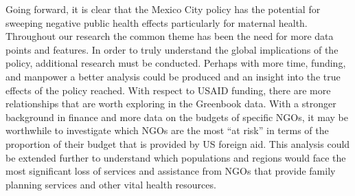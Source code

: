 \documentclass[11pt,]{article}
\begin{document}
Going forward, it is clear that the Mexico City policy has the potential
for sweeping negative public health effects particularly for maternal
health. Throughout our research the common theme has been the need for
more data points and features. In order to truly understand the global
implications of the policy, additional research must be conducted.
Perhaps with more time, funding, and manpower a better analysis could be
produced and an insight into the true effects of the policy reached.
With respect to USAID funding, there are more relationships that are
worth exploring in the Greenbook data. With a stronger background in
finance and more data on the budgets of specific NGOs, it may be
worthwhile to investigate which NGOs are the most ``at risk'' in terms
of the proportion of their budget that is provided by US foreign aid.
This analysis could be extended further to understand which populations
and regions would face the most significant loss of services and
assistance from NGOs that provide family planning services and other
vital health resources.

\newpage
\singlespacing 
\end{document}
